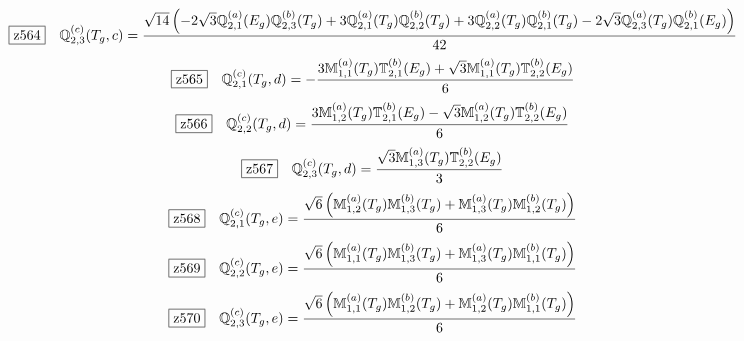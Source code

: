 \documentclass[fleqn,10pt,landscape]{jsarticle}
\begin{document}
\begin{dmath*}
\hspace*{3mm}\fbox{z564}\quad \mathbb{Q}_{2,3}^{(c)}(T_{g},c)=\frac{\sqrt{14} \left(- 2 \sqrt{3} \mathbb{Q}_{2,1}^{(a)}(E_{g}) \mathbb{Q}_{2,3}^{(b)}(T_{g}) + 3 \mathbb{Q}_{2,1}^{(a)}(T_{g}) \mathbb{Q}_{2,2}^{(b)}(T_{g}) + 3 \mathbb{Q}_{2,2}^{(a)}(T_{g}) \mathbb{Q}_{2,1}^{(b)}(T_{g}) - 2 \sqrt{3} \mathbb{Q}_{2,3}^{(a)}(T_{g}) \mathbb{Q}_{2,1}^{(b)}(E_{g})\right)}{42}
\end{dmath*}
\begin{dmath*}
\hspace*{3mm}\fbox{z565}\quad \mathbb{Q}_{2,1}^{(c)}(T_{g},d)=- \frac{3 \mathbb{M}_{1,1}^{(a)}(T_{g}) \mathbb{T}_{2,1}^{(b)}(E_{g}) + \sqrt{3} \mathbb{M}_{1,1}^{(a)}(T_{g}) \mathbb{T}_{2,2}^{(b)}(E_{g})}{6}
\end{dmath*}
\begin{dmath*}
\hspace*{3mm}\fbox{z566}\quad \mathbb{Q}_{2,2}^{(c)}(T_{g},d)=\frac{3 \mathbb{M}_{1,2}^{(a)}(T_{g}) \mathbb{T}_{2,1}^{(b)}(E_{g}) - \sqrt{3} \mathbb{M}_{1,2}^{(a)}(T_{g}) \mathbb{T}_{2,2}^{(b)}(E_{g})}{6}
\end{dmath*}
\begin{dmath*}
\hspace*{3mm}\fbox{z567}\quad \mathbb{Q}_{2,3}^{(c)}(T_{g},d)=\frac{\sqrt{3} \mathbb{M}_{1,3}^{(a)}(T_{g}) \mathbb{T}_{2,2}^{(b)}(E_{g})}{3}
\end{dmath*}
\begin{dmath*}
\hspace*{3mm}\fbox{z568}\quad \mathbb{Q}_{2,1}^{(c)}(T_{g},e)=\frac{\sqrt{6} \left(\mathbb{M}_{1,2}^{(a)}(T_{g}) \mathbb{M}_{1,3}^{(b)}(T_{g}) + \mathbb{M}_{1,3}^{(a)}(T_{g}) \mathbb{M}_{1,2}^{(b)}(T_{g})\right)}{6}
\end{dmath*}
\begin{dmath*}
\hspace*{3mm}\fbox{z569}\quad \mathbb{Q}_{2,2}^{(c)}(T_{g},e)=\frac{\sqrt{6} \left(\mathbb{M}_{1,1}^{(a)}(T_{g}) \mathbb{M}_{1,3}^{(b)}(T_{g}) + \mathbb{M}_{1,3}^{(a)}(T_{g}) \mathbb{M}_{1,1}^{(b)}(T_{g})\right)}{6}
\end{dmath*}
\begin{dmath*}
\hspace*{3mm}\fbox{z570}\quad \mathbb{Q}_{2,3}^{(c)}(T_{g},e)=\frac{\sqrt{6} \left(\mathbb{M}_{1,1}^{(a)}(T_{g}) \mathbb{M}_{1,2}^{(b)}(T_{g}) + \mathbb{M}_{1,2}^{(a)}(T_{g}) \mathbb{M}_{1,1}^{(b)}(T_{g})\right)}{6}
\end{dmath*}
\end{document}
